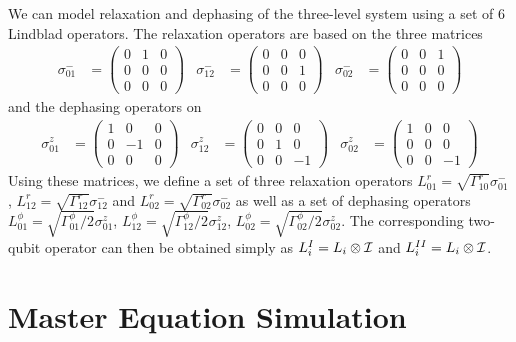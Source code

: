 We can model relaxation and dephasing of the three-level system using a set of 6 Lindblad operators. The relaxation operators are based on the three matrices
%
\begin{align}
\sigma^-_{01} & =  \left( \begin{array}{ccc} 0 & 1 & 0 \\ 0 & 0 & 0 \\ 0 & 0 & 0 \end{array} \right) & \sigma^-_{12} & =  \left( \begin{array}{ccc} 0 & 0 & 0 \\ 0 & 0 & 1 \\ 0 & 0 & 0 \end{array} \right) &
\sigma^-_{02} & =  \left( \begin{array}{ccc} 0 & 0 & 1 \\ 0 & 0 & 0 \\ 0 & 0 & 0 \end{array} \right)
\end{align}
%
and the dephasing operators on
%
\begin{align}
\sigma^z_{01} & =  \left( \begin{array}{ccc} 1 & 0 & 0 \\ 0 &-1 & 0 \\ 0 & 0 & 0 \end{array} \right) &
\sigma^z_{12} & =  \left( \begin{array}{ccc} 0 & 0 & 0 \\ 0 & 1 & 0 \\ 0 & 0 &-1 \end{array} \right) &
\sigma^z_{02} & =  \left( \begin{array}{ccc} 1 & 0 & 0 \\ 0 & 0 & 0 \\ 0 & 0 &-1 \end{array} \right)  
\end{align}
%
Using these matrices, we define a set of three relaxation operators $L^r_{01} = \sqrt{\Gamma^r_{10}}\sigma^-_{01}$, $L^r_{12} = \sqrt{\Gamma^r_{12}}\sigma^-_{12}$ and $L^r_{02}=\sqrt{\Gamma^r_{02}}\sigma^-_{02}$ as well as a set of dephasing operators $L^\phi_{01} = \sqrt{\Gamma^\phi_{01}/2}\sigma^z_{01}$, $L^\phi_{12} = \sqrt{\Gamma^\phi_{12}/2}\sigma^z_{12}$, $L^\phi_{02}=\sqrt{\Gamma^\phi_{02}/2}\sigma^z_{02}$. The corresponding two-qubit operator can then be obtained simply as $L^I_i = L_i\otimes {\cal I}$ and $L^{II}_i = L_i\otimes {\cal I}$.

\section{Master Equation Simulation}

